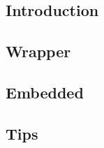 
\subsection{Introduction}


%

\subsection{Wrapper}


\subsection{Embedded}


\subsection{Tips}



